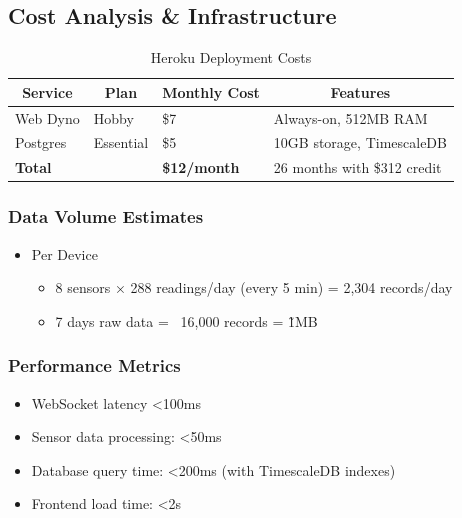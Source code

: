 \documentclass[conference]{IEEEtran}
\begin{document}
    \subsection{\textbf{Cost Analysis \& Infrastructure}}
            \begin{table}[htbp]
            \caption{Heroku Deployment Costs}
            \begin{center}
            \small
            \setlength{\tabcolsep}{4pt} 
            \renewcommand{\arraystretch}{1.3} 
            \begin{tabular}{|p{1.8cm}|p{1.5cm}|p{1.8cm}|p{2.5cm}|}
            \hline
            \multicolumn{1}{|c|}{\textbf{Service}} & \multicolumn{1}{c|}{\textbf{Plan}} & \multicolumn{1}{c|}{\textbf{Monthly Cost}} & \multicolumn{1}{c|}{\textbf{Features}} \\ \hline
            Web Dyno & Hobby & \$7 & Always-on, 512MB RAM \\ \hline
            Postgres & Essential & \$5 & 10GB storage, TimescaleDB \\ \hline
            \textbf{Total} & & \textbf{\$12/month} & 26 months with \$312 credit \\ \hline
            \end{tabular}%
            \label{tab:heroku_costs}
            \end{center}
            \end{table}
        \subsubsection{Data Volume Estimates}
        \begin{itemize}
            \item Per Device
            \begin{itemize}
                \item 8 sensors × 288 readings/day (every 5 min) = 2,304 records/day
                \item 7 days raw data = ~16,000 records = \~1MB
            \end{itemize}
        \end{itemize}
        \subsubsection{Performance Metrics}
        \begin{itemize}
            \item WebSocket latency <100ms
            \item Sensor data processing: <50ms
            \item Database query time: <200ms (with TimescaleDB indexes)
            \item Frontend load time: <2s
        \end{itemize}
            
\end{document}
